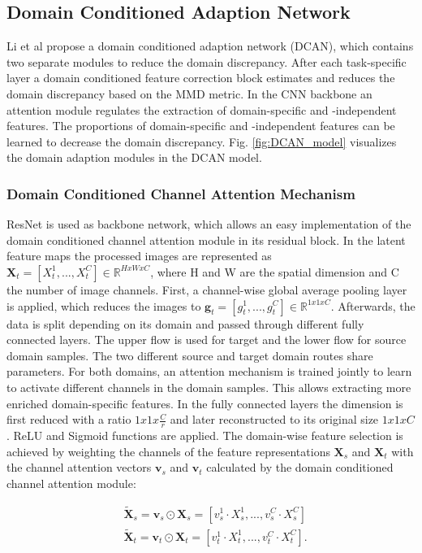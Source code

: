 \subsection{Domain Conditioned Adaption Network}
Li et al \cite{li2020} propose a domain conditioned adaption network (DCAN), which contains two separate modules to reduce the domain discrepancy. After each task-specific layer a domain conditioned feature correction block estimates and reduces the domain discrepancy based on the MMD metric. In the CNN backbone an attention module regulates the extraction of domain-specific and -independent features. The proportions of domain-specific and -independent features can be learned to decrease the domain discrepancy. Fig. \ref{fig:DCAN_model} visualizes the domain adaption modules in the DCAN model.

\subsubsection{Domain Conditioned Channel Attention Mechanism}
ResNet is used as backbone network, which allows an easy implementation of the domain conditioned channel attention module in its residual block. In the latent feature maps the processed images are represented as $\pmb{X}_{t} = [X^{1}_{t},...,X^{C}_{t}] \in \mathbb{R}^{HxWxC}$, where H and W are the spatial dimension and C the number of image channels. First, a channel-wise global average pooling layer is applied, which reduces the images to  $\pmb{g}_{t} = [g^{1}_{t},...,g^{C}_{t}] \in \mathbb{R}^{1x1xC}$. Afterwards, the data is split depending on its domain and passed through different fully connected layers. The upper flow is used for target and the lower flow for source domain samples. The two different source and target domain routes share parameters. For both domains, an attention mechanism is trained jointly to learn to activate different channels in the domain samples. This allows extracting more enriched domain-specific features. In the fully connected layers the dimension is first reduced with a ratio ${1x1x\frac{C}{r}}$ and later reconstructed to its original size ${1x1xC}$. ReLU and Sigmoid functions are applied. The domain-wise feature selection is achieved by weighting the channels of the feature representations $\pmb{X}_{s}$ and $\pmb{X}_{t}$ with the channel attention vectors $\pmb{v}_{s}$ and $\pmb{v}_{t}$ calculated by the domain conditioned channel attention module:

\begin{equation}
    \begin{aligned}
        &\pmb{\tilde{X}}_{s} = \pmb{v}_{s} \odot \pmb{X}_{s} = [v_{s}^{1} \cdot X_{s}^{1}, ..., v_{s}^{C} \cdot X_{s}^{C}]\\
        &\pmb{\tilde{X}}_{t} = \pmb{v}_{t} \odot \pmb{X}_{t} = [v_{t}^{1} \cdot X_{t}^{1}, ..., v_{t}^{C} \cdot X_{t}^{C}].
    \end{aligned}
\end{equation}


